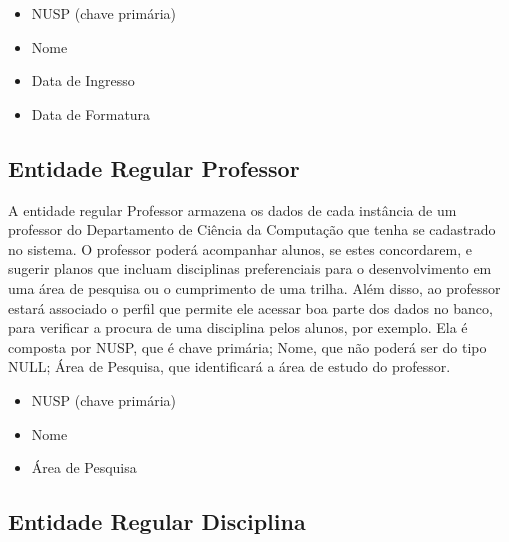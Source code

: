 \documentclass[a4paper]{article}
\begin{document}
\begin{itemize}
    \item NUSP (chave primária)
    \item Nome
    \item Data de Ingresso
    \item Data de Formatura
\end{itemize}

\subsection*{Entidade Regular Professor}


A entidade regular Professor armazena os dados de cada instância de um professor
do Departamento de Ciência da Computação que tenha se cadastrado no sistema. O
professor poderá acompanhar alunos, se estes concordarem, e sugerir planos que
incluam disciplinas preferenciais para o desenvolvimento em uma área de pesquisa
ou o cumprimento de uma trilha. Além disso, ao professor estará associado o
perfil que permite ele acessar boa parte dos dados no banco, para verificar a
procura de uma disciplina pelos alunos, por exemplo. Ela é composta por NUSP, que é
chave primária;  Nome, que não poderá ser do tipo NULL; Área de Pesquisa, que
identificará a área de estudo do professor.

\begin{itemize}
    \item NUSP (chave primária)
    \item Nome
    \item Área de Pesquisa
\end{itemize}

\subsection*{Entidade Regular Disciplina}
\end{document}
